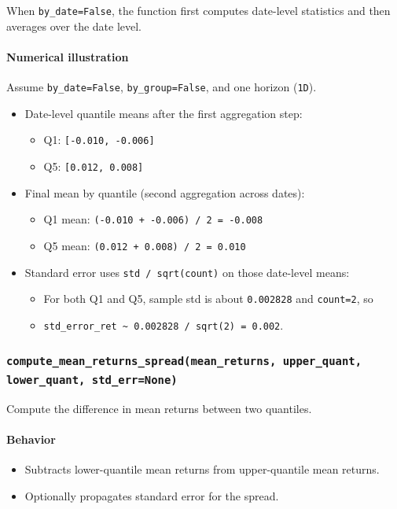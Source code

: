 \documentclass[11pt]{article}
\begin{document}
When \texttt{by\_date=False}, the function first computes date-level statistics and then averages over the date level.

\paragraph{Numerical illustration}
Assume \texttt{by\_date=False}, \texttt{by\_group=False}, and one horizon (\texttt{1D}).

\begin{itemize}
  \item Date-level quantile means after the first aggregation step:
  \begin{itemize}
    \item Q1: \texttt{[-0.010, -0.006]}
    \item Q5: \texttt{[0.012, 0.008]}
  \end{itemize}
  \item Final mean by quantile (second aggregation across dates):
  \begin{itemize}
    \item Q1 mean: \texttt{(-0.010 + -0.006) / 2 = -0.008}
    \item Q5 mean: \texttt{(0.012 + 0.008) / 2 = 0.010}
  \end{itemize}
  \item Standard error uses \texttt{std / sqrt(count)} on those date-level means:
  \begin{itemize}
    \item For both Q1 and Q5, sample std is about \texttt{0.002828} and \texttt{count=2}, so
    \item \texttt{std\_error\_ret \textasciitilde{} 0.002828 / sqrt(2) = 0.002}.
  \end{itemize}
\end{itemize}

\subsubsection{\texttt{compute\_mean\_returns\_spread(mean\_returns, upper\_quant, lower\_quant, std\_err=None)}}
Compute the difference in mean returns between two quantiles.

\paragraph{Behavior}
\begin{itemize}
  \item Subtracts lower-quantile mean returns from upper-quantile mean returns.
  \item Optionally propagates standard error for the spread.
\end{itemize}
\end{document}

